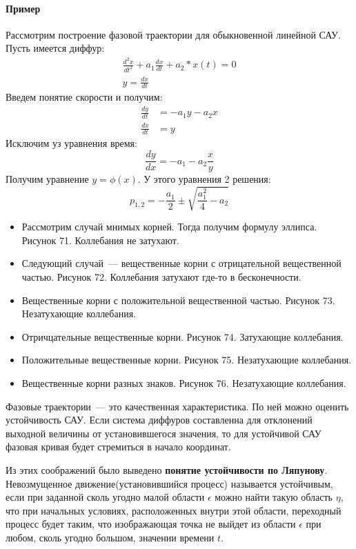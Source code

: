 \paragraph{Пример} Рассмотрим построение фазовой траектории для обыкновенной линейной САУ. Пусть имеется диффур:
\begin{align*}
	\frac{d^2x}{dt^2}+a_1\frac{dx}{dt}+a_2*x(t)=0 \\
	y = \frac{dx}{dt} 
\end{align*}
Введем понятие скорости и получим:
$$
	\begin{array}{cc}
		\frac{dy}{dt} &= -a_1y-a_2x \\
		\frac{dx}{dt} &= y
	\end{array}
$$
Исключим уз уравнения время:
$$
	\frac{dy}{dx} = -a_1-a_2\frac{x}{y}
$$
Получим уравнение $y=\phi(x)$. У этого уравнения 2 решения:
$$
	p_{1,2}=-\frac{a_1}2\pm\sqrt{\frac{a_1^2}4-a_2}
$$
\begin{itemize}
	\item Рассмотрим случай мнимых корней. Тогда получим формулу эллипса. Рисунок 71. Коллебания не затухают.

	\item Следующий случай~--- вещественные корни с отрицательной вещественной частью. Рисунок 72. Коллебания затухают где-то в бесконечности.

	\item Вещественные корни с положительной вещественной частью. Рисунок 73. Незатухающие коллебания.

	\item Отричцательные вещественные корни. Рисунок 74. Затухающие коллебания.
	
	\item Положительные вещественные корни. Рисунок 75. Незатухающие коллебания.
	
	\item Вещественные корни разных знаков. Рисунок 76. Незатухающие коллебания.
\end{itemize}
Фазовые траектории~--- это качественная характеристика. По ней можно оценить устойчивость САУ. Если система диффуров составленна для отклонений выходной величины от установившегося значения, то для устойчивой САУ фазовая кривая будет стремиться в начало координат.

Из этих соображений было выведено \textbf{понятие устойчивости по Ляпунову}. Невозмущенное движение(установившийся процесс) называется устойчивым, если при заданной сколь угодно малой области $\epsilon$ можно найти такую область $\eta$, что при начальных условиях, расположенных внутри этой области, переходный процесс будет таким, что изображающая точка не выйдет из области $\epsilon$ при любом, сколь угодно большом, значении времени $t$.

